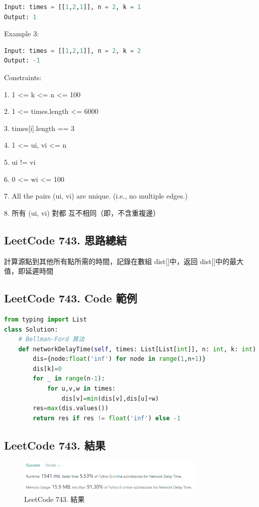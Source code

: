 \documentclass[10pt,UTF8]{ctexart}
\begin{document}
\begin{lstlisting}[language={python}]
Input: times = [[1,2,1]], n = 2, k = 1
Output: 1
\end{lstlisting}

Example 3:

\begin{lstlisting}[language={python}]
Input: times = [[1,2,1]], n = 2, k = 2
Output: -1
\end{lstlisting}

Constraints:

1. 1 <= k <= n <= 100

2. 1 <= times.length <= 6000

3. times[i].length == 3

4. 1 <= ui, vi <= n

5. ui != vi

6. 0 <= wi <= 100

7. All the pairs (ui, vi) are unique. (i.e., no multiple edges.)

8. 所有 (ui, vi) 對都 互不相同（即，不含重複邊）


\subsection{LeetCode 743. 思路總結}

計算源點到其他所有點所需的時間，記錄在數組 dist[]中，返回 dist[]中的最大值，即延遲時間

\subsection{LeetCode 743. Code 範例}

\begin{lstlisting}[language={python}]
from typing import List
class Solution:
    # Bellman-Ford 算法
    def networkDelayTime(self, times: List[List[int]], n: int, k: int) -> int:
        dis={node:float('inf') for node in range(1,n+1)}
        dis[k]=0
        for _ in range(n-1):
            for u,v,w in times:
                dis[v]=min(dis[v],dis[u]+w)
        res=max(dis.values())
        return res if res != float('inf') else -1   
\end{lstlisting}

\subsection{LeetCode 743. 結果}

\begin{figure}[H]
\centering 
\includegraphics[width=0.80\textwidth]{lc-743-o.png} 
\caption{LeetCode 743. 結果}
\label{Test}
\end{figure}
\end{document}
